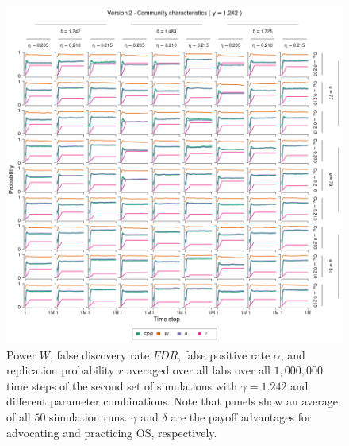 \documentclass[meta, authordate]{jote-new-article}
\begin{document}
\begin{figure}
  \begin{fullwidth}
    \centering
    \includegraphics[width=\textwidth]{v2_cha_plot_sens_payypro1.242.png}
    \caption{Power $W$, false discovery rate $FDR$, false positive rate $\alpha$, and replication probability $r$ averaged over all labs over all $1,000,000$ time steps of the second set of simulations with $\gamma=1.242$ and different parameter combinations. Note that panels show an average of all $50$ simulation runs. $\gamma$ and $\delta$ are the payoff advantages for advocating and practicing OS, respectively.}
    \label{fig:v2_cha_plot_sens_payypro1.242}
  \end{fullwidth}
\end{figure}
%
%
\end{document}
